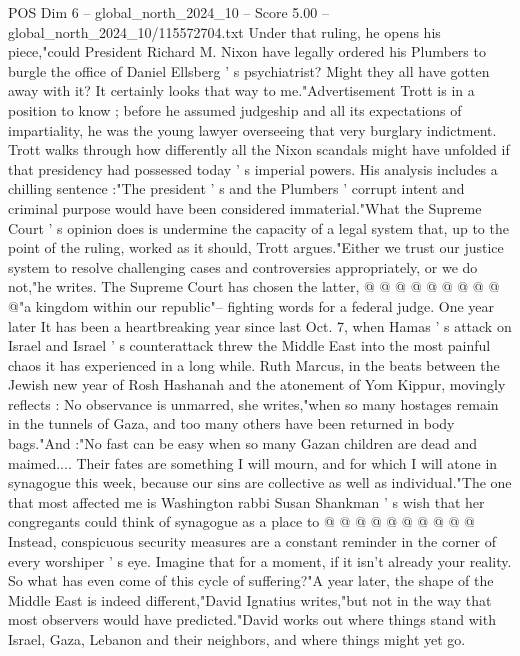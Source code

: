 \begin{textsample}{POS Dim 6 – global\_north\_2024\_10 – Score 5.00 – global\_north\_2024\_10/115572704.txt}  \label{ex:f6_pos_375}
Under that ruling, he opens his piece,"could President Richard M.
Nixon have legally ordered his Plumbers to burgle the office of Daniel Ellsberg ' s psychiatrist?
Might they all have gotten away with it?
It certainly looks that way to me."Advertisement Trott is in a position to know ; before he assumed judgeship and all its expectations of impartiality, he was the young lawyer overseeing that very burglary indictment.
Trott walks through how differently all the Nixon scandals might have unfolded if that presidency had possessed today ' s imperial powers.
His analysis includes a chilling sentence :"The president ' s and the Plumbers ' corrupt intent and criminal purpose would have been considered immaterial."What the Supreme Court ' s opinion does is undermine the capacity of a legal system that, up to the point of the ruling, worked as it should, Trott argues."Either we trust our justice system to resolve challenging cases and controversies appropriately, or we do not,"he writes.
The Supreme Court has chosen the latter, @ @ @ @ @ @ @ @ @ @"a kingdom within our republic"-- fighting words for a federal judge.
One year later It has been a heartbreaking year since last Oct. 7, when Hamas ' s attack on Israel and Israel ' s counterattack threw the Middle East into the most painful chaos it has experienced in a long while.
Ruth Marcus, in the beats between the Jewish new year of Rosh Hashanah and the atonement of Yom Kippur, movingly reflects : No observance is unmarred, she writes,"when so many hostages remain in the tunnels of Gaza, and too many others have been returned in body bags."And :"No fast can be easy when so many Gazan children are dead and maimed....
Their fates are something I will mourn, and for which I will atone in synagogue this week, because our sins are collective as well as individual."The one that most affected me is Washington rabbi Susan Shankman ' s wish that her congregants could think of synagogue as a place to @ @ @ @ @ @ @ @ @ @ Instead, conspicuous security measures are a constant reminder in the corner of every worshiper ' s eye.
Imagine that for a moment, if it isn't already your reality.
So what has even come of this cycle of suffering?"A year later, the shape of the Middle East is indeed different,"David Ignatius writes,"but not in the way that most observers would have predicted."David works out where things stand with Israel, Gaza, Lebanon and their neighbors, and where things might yet go.

\end{textsample}
